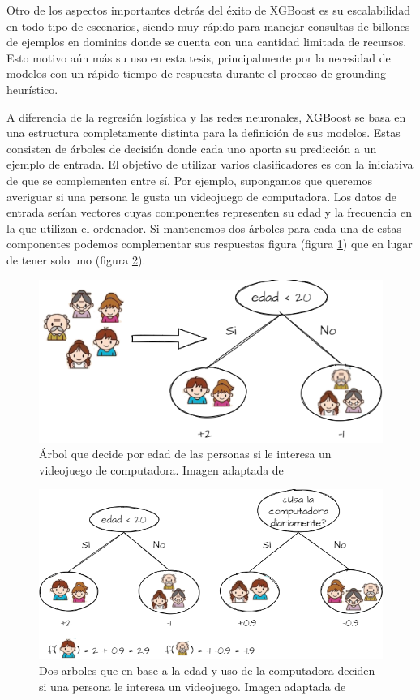Otro de los aspectos importantes detrás del éxito de XGBoost es su escalabilidad
en todo tipo de escenarios, siendo muy rápido para manejar consultas de billones
de ejemplos en dominios donde se cuenta con una cantidad limitada de recursos.
Esto motivo aún más su uso en esta tesis, principalmente por la necesidad de
modelos con un rápido tiempo de respuesta durante el proceso de grounding
heurístico.

A diferencia de la regresión logística y las redes neuronales, XGBoost se basa
en una estructura completamente distinta para la definición de sus modelos.
Estas consisten de árboles de decisión donde cada uno aporta su predicción a un
ejemplo de entrada. El objetivo de utilizar varios clasificadores es con la
iniciativa de que se complementen entre sí. Por ejemplo, supongamos que queremos
averiguar si una persona le gusta un videojuego de computadora. Los datos de
entrada serían vectores cuyas componentes representen su edad y la frecuencia en
la que utilizan el ordenador. Si mantenemos dos árboles para cada una de estas
componentes podemos complementar sus respuestas figura (figura
\ref{fig:xgboost_tree}) que en lugar de tener solo uno (figura
\ref{fig:xgboost_two_tree}).

\begin{figure}
    \centering
    \includegraphics[scale=0.4]{figures/xgboost_tree.png}
    \caption{Árbol que decide por edad de las personas si le interesa un
    videojuego de computadora. Imagen adaptada de \citep{Tianqi-2016}}
    \label{fig:xgboost_tree}
\end{figure}

\begin{figure}
    \centering
    \includegraphics[scale=0.4]{figures/xgboost_two_tree.png}
    \caption{Dos arboles que en base a la edad y uso de la computadora deciden
    si una persona le interesa un videojuego. Imagen adaptada de
    \citep{Tianqi-2016}}
    \label{fig:xgboost_two_tree}
\end{figure}

